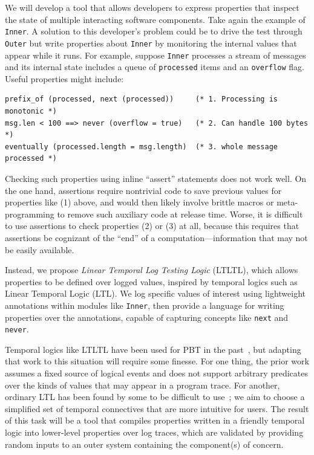 We will develop a tool that allows developers to express properties that inspect
the state of multiple interacting software components. Take again the example of
\lstinline{Inner}. A solution to this developer's problem could be to drive the
test through \lstinline{Outer} but write properties about
\lstinline{Inner} by monitoring the internal values that appear while it
runs. For example, suppose
\lstinline{Inner} processes a stream of messages and its internal state
includes a queue of \lstinline{processed} items and an
\lstinline{overflow} flag. Useful properties might include:

\begin{lstlisting}
prefix_of (processed, next (processed))     (* 1. Processing is monotonic *)
msg.len < 100 ==> never (overflow = true)   (* 2. Can handle 100 bytes    *)
eventually (processed.length = msg.length)  (* 3. whole message processed *)
\end{lstlisting}

Checking such properties using inline ``assert'' statements
does not work well. On the one hand, assertions
require nontrivial code to save previous values for properties like (1)
above, and would then likely involve brittle macros or meta-programming to remove such
auxiliary code at release time. Worse, it is difficult to use
assertions to check properties (2) or (3) at all, because this
requires that assertions be cognizant of the ``end'' of a
computation---information that may not be easily available.

Instead, we propose {\em Linear Temporal Log Testing Logic} (LTLTL), which allows
properties to be defined over logged values, inspired by temporal
logics such as Linear Temporal Logic (LTL).  We
log specific values of interest using lightweight annotations
within modules like \lstinline{Inner}, then provide a language for
writing properties over the annotations, capable of capturing concepts like
\lstinline{next} and \lstinline{never}.

Temporal logics like LTLTL have been used for PBT in the
past~\cite{oconnor_quickstrom_2022}, but adapting that work to this
situation will require some finesse. For one thing, the prior work
assumes a fixed source of logical events and does not
support arbitrary predicates over the kinds of values that may appear
in a program trace. For another, ordinary LTL has been found by some to be
difficult to use~\cite{greenman_little_2022}; we aim to choose a
simplified set of temporal connectives that are more intuitive for users.
%
The result of this task will be a tool that compiles properties written
in a friendly temporal logic into lower-level properties over log
traces, which are validated by providing random inputs to an outer
system {containing} the component(s) of concern.

